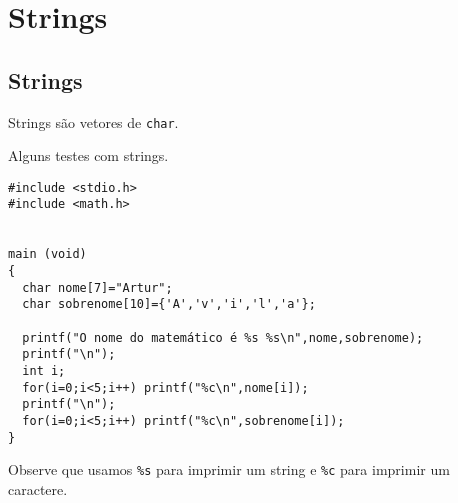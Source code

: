 
\chapter{Strings}
\section{Strings}
Strings são vetores de \verb|char|.
\begin{ex}Alguns testes com strings.
\end{ex}
\begin{verbatim}
#include <stdio.h>
#include <math.h>


main (void)
{
  char nome[7]="Artur";
  char sobrenome[10]={'A','v','i','l','a'};

  printf("O nome do matemático é %s %s\n",nome,sobrenome);
  printf("\n");
  int i;
  for(i=0;i<5;i++) printf("%c\n",nome[i]);
  printf("\n");
  for(i=0;i<5;i++) printf("%c\n",sobrenome[i]);
}
\end{verbatim}

Observe que usamos \verb|%s| para imprimir um string e \verb|%c| para imprimir um caractere.

